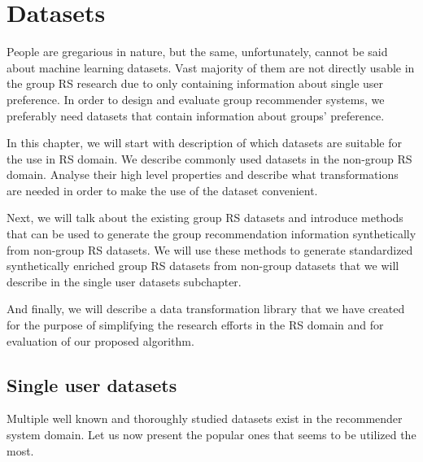 

\chapter{Datasets}  \label{chap:datasets}
People are gregarious in nature, but the same, unfortunately, cannot be said about machine learning datasets. Vast majority of them are not directly usable in the group RS research due to only containing information about single user preference. In order to design and evaluate group recommender systems, we preferably need datasets that contain information about groups' preference.

In this chapter, we will start with description of which datasets are suitable for the use in RS domain. We describe commonly used datasets in the non-group RS domain. Analyse their high level properties and describe what transformations are needed in order to make the use of the dataset convenient. 

Next, we will talk about the existing group RS datasets and introduce methods that can be used to generate the group recommendation information synthetically from non-group RS datasets. We will use these methods to generate standardized synthetically enriched group RS datasets from non-group datasets that we will describe in the single user datasets subchapter.

And finally, we will describe a data transformation library that we have created for the purpose of simplifying the research efforts in the RS domain and for evaluation of our proposed algorithm.


\section{Single user datasets}
Multiple well known and thoroughly studied datasets exist in the recommender system domain. Let us now present the popular ones that seems to be utilized the most.

